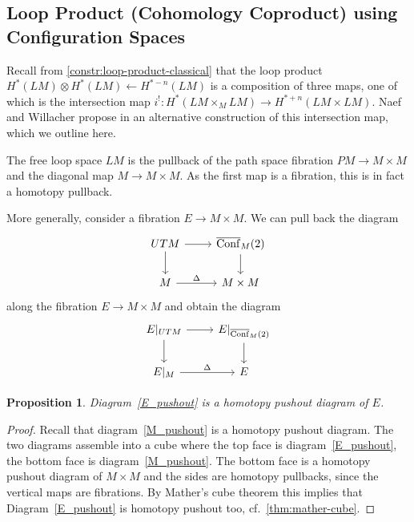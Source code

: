 \documentclass{scrartcl}
\theoremstyle{plain}
\newtheorem{proposition}[theorem]{Proposition}
\theoremstyle{definition}
\newcommand{\from}{\leftarrow}
\DeclareMathOperator{\cConf}{\overline{Conf}}
\begin{document}
\subsection{Loop Product (Cohomology Coproduct) using Configuration Spaces}\label{subsec:loop-product}
Recall from \cref{constr:loop-product-classical} that the loop product $H^*(LM)\otimes H^*(LM)\from H^{*-n}(LM)$ is a composition of three maps, one of which is the intersection map $i^! \colon H^*(LM\times_M LM)\to H^{*+n}(LM\times LM)$. Naef and Willacher propose in \cite{naef2019string} an alternative construction of this intersection map, which we outline here.

The free loop space $LM$ is the pullback of the path space fibration $PM \to M\times M$ and the diagonal map $M\to M\times M$. As the first map is a fibration, this is in fact a homotopy pullback. %

More generally, consider a fibration $E\to M\times M$. We can pull back the diagram 
\begin{equation}\label{M_pushout}
    \begin{tikzcd}
        UTM \dar\rar & \cConf_M(2)\dar \\
        M \rar["\Delta"] & M\times M
    \end{tikzcd}
\end{equation}
along the fibration $E\to M\times M$ and obtain the diagram
\begin{equation}\label{E_pushout}
    \begin{tikzcd}
        E|_{UTM} \dar\rar & E|_{\cConf_M(2)}\dar \\
        E|_M \rar["\Delta"] & E
    \end{tikzcd}
\end{equation}
\begin{proposition}\label{lem:pullback_cube}
    Diagram~\ref{E_pushout} is a homotopy pushout diagram of $E$. 
\end{proposition}
\begin{proof}
Recall that diagram~\ref{M_pushout} is a homotopy pushout diagram. The two diagrams assemble into a cube where the top face is diagram~\ref{E_pushout}, the bottom face is diagram~\ref{M_pushout}. The bottom face is a homotopy pushout diagram of $M\times M$ and the sides are homotopy pullbacks, since the vertical maps are fibrations. By Mather's cube theorem this implies that Diagram~\ref{E_pushout} is homotopy pushout too, cf.~\cref{thm:mather-cube}. 
\end{proof}
\end{document}
